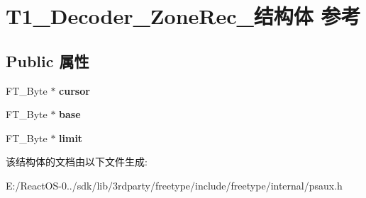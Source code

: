 \hypertarget{struct_t1___decoder___zone_rec__}{}\section{T1\+\_\+\+Decoder\+\_\+\+Zone\+Rec\+\_\+结构体 参考}
\label{struct_t1___decoder___zone_rec__}
\subsection*{Public 属性}
\begin{DoxyCompactItemize}
\item 
\mbox{\label{struct_t1___decoder___zone_rec___a14e9f190496672f6174ead91e375767d}} 
F\+T\+\_\+\+Byte $\ast$ {\bfseries cursor}
\item 
\mbox{\label{struct_t1___decoder___zone_rec___a9cd7e54387b238504b1e8aae47b7da7c}} 
F\+T\+\_\+\+Byte $\ast$ {\bfseries base}
\item 
\mbox{\label{struct_t1___decoder___zone_rec___a46fe1e4aa9bdb712ae414305f88d95db}} 
F\+T\+\_\+\+Byte $\ast$ {\bfseries limit}
\end{DoxyCompactItemize}


该结构体的文档由以下文件生成\+:\begin{DoxyCompactItemize}
\item 
E\+:/\+React\+O\+S-\/0../sdk/lib/3rdparty/freetype/include/freetype/internal/psaux.\+h\end{DoxyCompactItemize}
